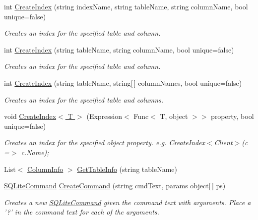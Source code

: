 \begin{DoxyCompactItemize}
int \hyperlink{class_s_q_lite_1_1_s_q_lite_connection_a41bc451f0fed96a6cb79ae2d61ab3a11}{Create\+Index} (string index\+Name, string table\+Name, string column\+Name, bool unique=false)
\begin{DoxyCompactList}\small\item\em Creates an index for the specified table and column. \end{DoxyCompactList}\item 
int \hyperlink{class_s_q_lite_1_1_s_q_lite_connection_a91adc40b863214a5efc495b33ec9a351}{Create\+Index} (string table\+Name, string column\+Name, bool unique=false)
\begin{DoxyCompactList}\small\item\em Creates an index for the specified table and column. \end{DoxyCompactList}\item 
int \hyperlink{class_s_q_lite_1_1_s_q_lite_connection_a30996f7f4a91d17d719ef4dd582b4cee}{Create\+Index} (string table\+Name, string\mbox{[}$\,$\mbox{]} column\+Names, bool unique=false)
\begin{DoxyCompactList}\small\item\em Creates an index for the specified table and columns. \end{DoxyCompactList}\item 
void \hyperlink{class_s_q_lite_1_1_s_q_lite_connection_a7283c295b89b54728d7201e0812ccaac}{Create\+Index$<$ T $>$} (Expression$<$ Func$<$ T, object $>$$>$ property, bool unique=false)
\begin{DoxyCompactList}\small\item\em Creates an index for the specified object property. e.\+g. Create\+Index$<$\+Client$>$(c =$>$ c.\+Name); \end{DoxyCompactList}\item 
List$<$ \hyperlink{class_s_q_lite_1_1_s_q_lite_connection_1_1_column_info}{Column\+Info} $>$ \hyperlink{class_s_q_lite_1_1_s_q_lite_connection_a695bad5670f4d38a9aae39e4aec85329}{Get\+Table\+Info} (string table\+Name)
\item 
\hyperlink{class_s_q_lite_1_1_s_q_lite_command}{S\+Q\+Lite\+Command} \hyperlink{class_s_q_lite_1_1_s_q_lite_connection_a112ac999fccd302bda742992f044f3ee}{Create\+Command} (string cmd\+Text, params object\mbox{[}$\,$\mbox{]} ps)
\begin{DoxyCompactList}\small\item\em Creates a new \hyperlink{class_s_q_lite_1_1_s_q_lite_command}{S\+Q\+Lite\+Command} given the command text with arguments. Place a '?' in the command text for each of the arguments. \end{DoxyCompactList}\item 
$$
\end{DoxyCompactItemize}
